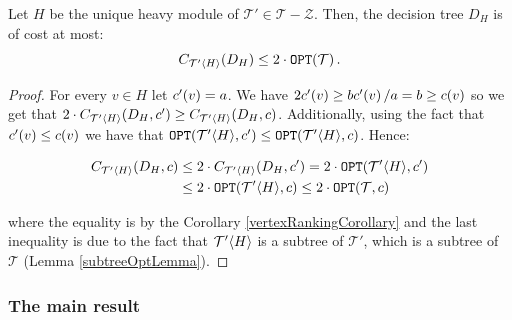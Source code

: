 \begin{lemma}\label{heavygroupcostlemma}
    Let $H$ be the unique heavy module of $\mathcal{T}'\in \mathcal{T}-\mathcal{Z}$. Then, the decision tree $D_H$ is of cost at most:
    $$C_{\mathcal{T}'\mathopen{}\langle H \rangle}\mathopen{}\left( D_H \right)\leq 2\cdot\texttt{OPT}\mathopen{}\left( \mathcal{T} \right).$$
    \begin{proof}
        
    For every $v\in H$ let $c'\mathopen{}\left( v \right)=a$. We have $2 c'\mathopen{}\left( v \right)\geq b c'\mathopen{}\left( v \right)/a =  b \geq c\mathopen{}\left( v \right)$ so we get that $2\cdot C_{\mathcal{T}'\mathopen{}\langle H \rangle}\mathopen{}\left( D_H, c' \right)\geq C_{\mathcal{T}'\mathopen{}\langle H \rangle}\mathopen{}\left( D_H, c \right)$. Additionally, using the fact that $c'\mathopen{}\left( v \right) \leq c\mathopen{}\left( v \right)$ we have that $\texttt{OPT}\mathopen{}\left( \mathcal{T}'\mathopen{}\langle H \rangle, c' \right)\leq \texttt{OPT}\mathopen{}\left( \mathcal{T}'\mathopen{}\langle H \rangle, c \right)$. Hence:
    
    \begin{align*}
        C_{\mathcal{T}'\mathopen{}\langle H \rangle}\mathopen{}\left( D_H, c \right)&\leq 2\cdot C_{\mathcal{T}'\mathopen{}\langle H \rangle}\mathopen{}\left( D_H, c' \right)=2\cdot\texttt{OPT}\mathopen{}\left( \mathcal{T}'\mathopen{}\langle H \rangle, c' \right) \\
        &\leq
        2\cdot\texttt{OPT}\mathopen{}\left( \mathcal{T}'\mathopen{}\langle H \rangle, c \right)\leq 2\cdot\texttt{OPT}\mathopen{}\left( \mathcal{T}, c \right)
    \end{align*}
    
        
    where the equality is by the Corollary \ref{vertexRankingCorollary} and the last inequality is due to the fact that $\mathcal{T}'\mathopen{}\langle H \rangle$ is a subtree of $\mathcal{T}'$, which is a subtree of $\mathcal{T}$ (Lemma \ref{subtreeOptLemma}).
    \end{proof}
\end{lemma}

\subsubsection{The main result}

